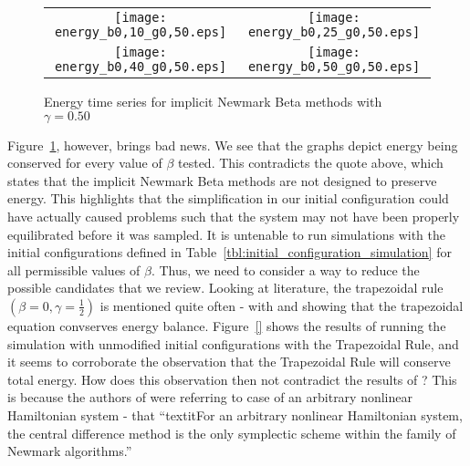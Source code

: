 \documentclass[../Main.tex]{subfiles}
\begin{document}
\begin{figure}[H]
\centering
 	\begin{tabular}{@{}cc@{}}
    		\texttt{[image: energy\_b0,10\_g0,50.eps]} &
    		\texttt{[image: energy\_b0,25\_g0,50.eps]} \\
    		\texttt{[image: energy\_b0,40\_g0,50.eps]} &
    		\texttt{[image: energy\_b0,50\_g0,50.eps]} \\
	\end{tabular}
  	\caption{Energy time series for implicit Newmark Beta methods with $\gamma = 0.50$}
	\label{fig:energy_time_series_gamma_0,50_implicit_beta}
\end{figure} 

Figure~\ref{fig:energy_time_series_gamma_0,50_implicit_beta}, however, brings bad news. We see that the graphs depict energy being conserved for every value of $\beta$ tested. This contradicts the quote above, which states that the implicit Newmark Beta methods are not designed to preserve energy. This highlights that the simplification in our initial configuration could have actually caused problems such that the system may not have been properly equilibrated before it was sampled. It is untenable to run simulations with the initial configurations defined in Table~\ref{tbl:initial_configuration_simulation} for all permissible values of $\beta$.
Thus, we need to consider a way to reduce the possible candidates that we review. Looking at literature, the trapezoidal rule $\left(\beta = 0, \gamma = \frac{1}{2}\right)$ is mentioned quite often - with \cite{DoyenErnPiperno2011} and \cite{Krenk} showing that the trapezoidal equation convserves energy balance. Figure~\ref{} shows the results of running the simulation with unmodified initial configurations with the Trapezoidal Rule, and it seems to corroborate the observation that the Trapezoidal Rule will conserve total energy. How does this observation then not contradict the results of \cite{SimoTarnowWong1992}? This is because the authors of  \cite{SimoTarnowWong1992} were referring to case of an arbitrary nonlinear Hamiltonian system - that ``textit{For an arbitrary nonlinear Hamiltonian system, the central difference method is the only symplectic scheme within the family of Newmark algorithms.}''
\end{document}
